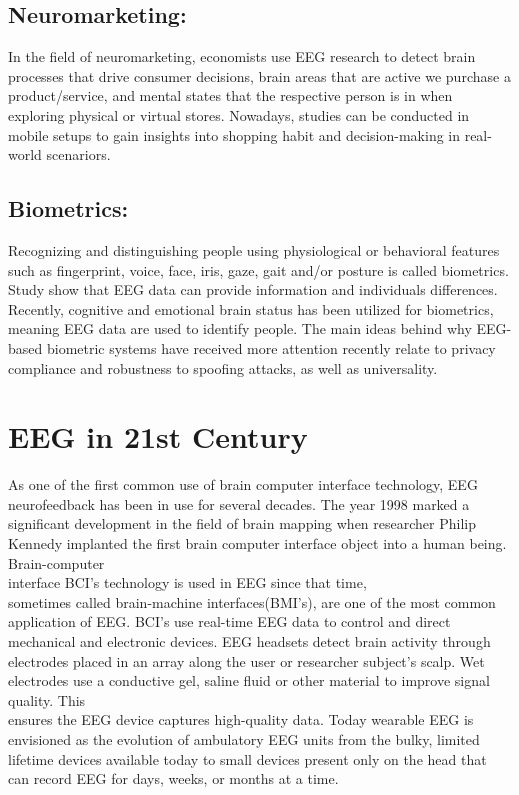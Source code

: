 \documentclass[12pt,a4paper]{article}
\begin{document}
\subsection{Neuromarketing:}

In the field of neuromarketing, economists use EEG research to detect brain processes that drive consumer decisions, brain areas that are active we purchase a product/service, and mental states that the respective person is in when exploring physical or virtual stores. Nowadays, studies can be conducted in mobile setups to gain insights into shopping habit and decision-making in real-world scenariors. 

\subsection{Biometrics:}

Recognizing and distinguishing people using physiological or behavioral features such as fingerprint, voice, face, iris, gaze, gait and/or posture is called biometrics. Study show that EEG data can provide information and individuals differences. Recently, cognitive and emotional brain status has been utilized for biometrics, meaning EEG data are used to identify people. The main ideas behind why EEG-based biometric systems have received more attention recently relate to privacy compliance and robustness to spoofing attacks, as well as universality.


\section{EEG in 21st Century} 


As one of the first common use of brain computer interface technology, EEG neurofeedback has been in use for several decades. The year 1998 marked a significant development in the field of brain mapping when researcher Philip Kennedy implanted the first brain computer interface object into a human being. Brain-computer\\ interface BCI's technology is used in EEG since that time,\\ sometimes called brain-machine interfaces(BMI's), are one of the most common application of EEG. BCI's use real-time EEG data to control and direct mechanical and electronic devices. EEG headsets detect brain activity through electrodes placed in an array along the user or researcher subject's scalp. Wet electrodes use a conductive gel, saline fluid or other material to improve signal quality. This\\ ensures the EEG device captures high-quality data. Today wearable EEG  is envisioned as the evolution of ambulatory EEG units from the bulky, limited lifetime devices available today to small devices present only on the head that can record EEG  for days, weeks, or months at a time.
\end{document}
